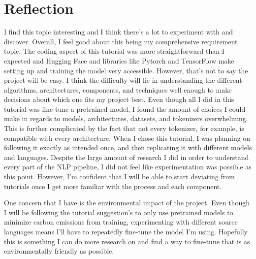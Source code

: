 \documentclass[10pt,twocolumn]{article}
\begin{document}
\section{Reflection}
I find this topic interesting and I think there’s a lot to experiment with and discover. Overall, I feel good about this being my comprehensive requirement topic. The coding aspect of this tutorial was more straightforward than I expected and Hugging Face and libraries like Pytorch and TensorFlow make setting up and training the model very accessible. 
However, that's not to say the project will be easy. I think the difficulty will lie in understanding the different algorithms, architectures, components, and techniques well enough to make decisions about which one fits my project best. Even though all I did in this tutorial was fine-tune a pretrained model, I found the amount of choices I could make in regards to models, architectures, datasets, and tokenizers overwhelming. This is further complicated by the fact that not every tokenizer, for example, is compatible with every architecture. When I chose this tutorial, I was planning on following it exactly as intended once, and then replicating it with different models and languages. Despite the large amount of research I did in order to understand every part of the NLP pipeline, I did not feel like experimentation was possible as this point. However, I'm confident that I will be able to start deviating from tutorials once I get more familiar with the process and each component. 

One concern that I have is the environmental impact of the project. Even though I will be following the tutorial suggestion's to only use pretrained models to minimize carbon emissions from training, experimenting with different source languages means I'll have to repeatedly fine-tune the model I'm using. Hopefully this is something I can do more research on and find a way to fine-tune that is as environmentally friendly as possible.
\end{document}
